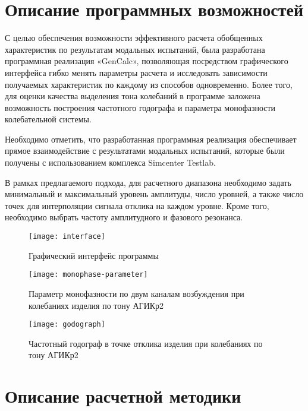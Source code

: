 %
%
%

\chapter{Описание программных возможностей}

С целью обеспечения возможности эффективного расчета обобщенных характеристик по результатам модальных испытаний, была разработана программная реализация «GenCalc», позволяющая посредством графического интерфейса  гибко менять параметры расчета и исследовать зависимости получаемых характеристик по каждому из способов одновременно. Более того, для оценки качества выделения тона
колебаний в программе заложена возможность построения частотного годографа  и параметра монофазности  колебательной системы.

Необходимо отметить, что разработанная программная реализация обеспечивает прямое взаимодействие с результатами модальных испытаний, которые были получены с использованием комплекса Simcenter Testlab.

В рамках предлагаемого подхода, для расчетного диапазона необходимо задать минимальный и максимальный уровень амплитуды, число уровней, а также число точек для интерполяции сигнала отклика на каждом уровне.
Кроме того, необходимо выбрать частоту амплитудного и фазового резонанса.

\begin{figure}[!htb]
	\centering
	\texttt{[image: interface]}
	\caption{Графический интерфейс программы} \label{interface}
\end{figure}

\begin{figure}[H]
	\centering
	\texttt{[image: monophase-parameter]}
	\caption{Параметр монофазности по двум каналам возбуждения при колебаниях изделия по тону АГИКр2} \label{monophase-parameter}
\end{figure}

\begin{figure}[!htb]
	\centering
	\texttt{[image: godograph]}
	\caption{Частотный годограф в точке отклика изделия при колебаниях
по тону АГИКр2} \label{godograph}
\end{figure}

\chapter{Описание расчетной методики}

